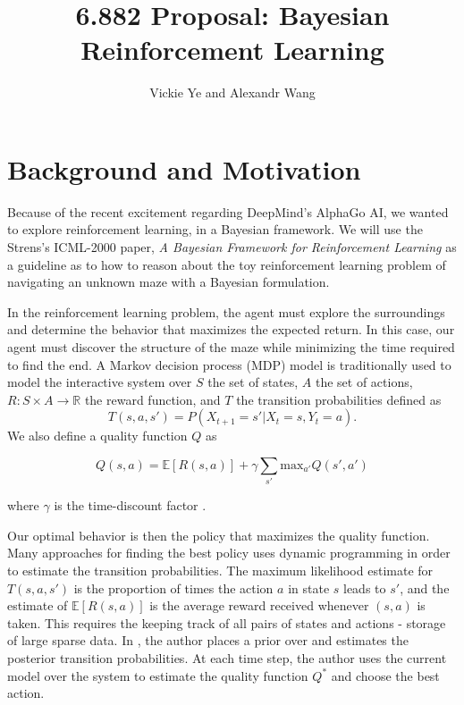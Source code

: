 \documentclass[11pt, twoside]{article}
\title{6.882 Proposal: Bayesian Reinforcement Learning}
\date{}
\author {Vickie Ye and Alexandr Wang}
\begin{document}
\maketitle

\section{Background and Motivation}
Because of the recent excitement regarding DeepMind's AlphaGo AI, we wanted to
explore reinforcement learning, in a Bayesian framework. We will use the Strens's
ICML-2000 paper, \textit{A Bayesian Framework for Reinforcement Learning} as a
guideline as to how to reason about the toy reinforcement learning problem of
navigating an unknown maze with a Bayesian formulation.

In the reinforcement learning problem, the agent must explore the surroundings
and determine the behavior that maximizes the expected return. In this case, our
agent must discover the structure of the maze while minimizing the time required
to find the end. A Markov decision process (MDP) model is traditionally used to
model the interactive system over $S$ the set of states, $A$ the set of actions,
$R: S \times A \rightarrow \mathbb{R}$ the reward function, and $T$ the transition
probabilities defined as
\begin{equation}
T(s, a, s') = P(X_{t+1} = s' | X_t = s, Y_t = a).
\end{equation}
We also define a quality function $Q$ as

\begin{equation}
Q(s, a) = \mathbb{E}[R(s, a)] + \gamma \sum_{s'} \textrm{max}_{a'} Q(s', a')
\end{equation}

where $\gamma$ is the time-discount factor \citep[p.3]{strens}.

Our optimal behavior is then the policy that maximizes the quality function. Many
approaches for finding the best policy uses dynamic programming in order to estimate
the transition probabilities. The maximum likelihood estimate for $T(s, a, s')$ is
the proportion of times the action $a$ in state $s$ leads to $s'$, and the estimate of
$\mathbb{E}[R(s, a)]$ is the average reward received whenever $(s, a)$ is taken. This
requires the keeping track of all pairs of states and actions - storage of large
sparse data. In \cite{strens}, the author places a prior over and estimates the
posterior transition probabilities. At each time step, the author uses the current
model over the system to estimate the quality function $Q^*$ and choose the best
action. 
\end{document}
